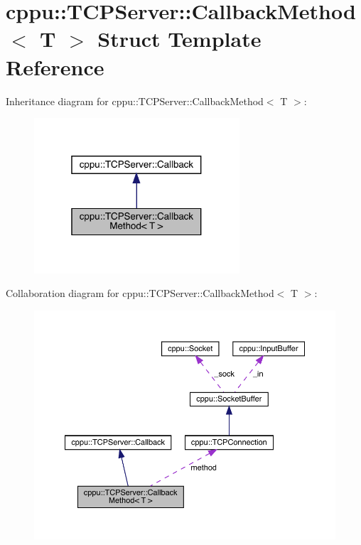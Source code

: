 \hypertarget{structcppu_1_1_t_c_p_server_1_1_callback_method}{}\section{cppu\+::T\+C\+P\+Server\+::Callback\+Method$<$ T $>$ Struct Template Reference}
\label{structcppu_1_1_t_c_p_server_1_1_callback_method}


Inheritance diagram for cppu\+::T\+C\+P\+Server\+::Callback\+Method$<$ T $>$\+:
\nopagebreak
\begin{figure}[H]
\begin{center}
\leavevmode
\includegraphics[width=217pt]{structcppu_1_1_t_c_p_server_1_1_callback_method__inherit__graph}
\end{center}
\end{figure}


Collaboration diagram for cppu\+::T\+C\+P\+Server\+::Callback\+Method$<$ T $>$\+:
\nopagebreak
\begin{figure}[H]
\begin{center}
\leavevmode
\includegraphics[width=350pt]{structcppu_1_1_t_c_p_server_1_1_callback_method__coll__graph}
\end{center}
\end{figure}

